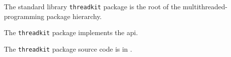 
The standard library {\tt threadkit} package is the root of the multithreaded-programming package hierarchy.

The {\tt threadkit} package implements the  api.

The {\tt threadkit} package source code is in .

